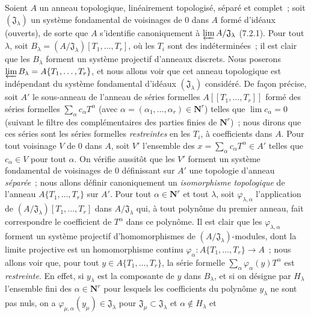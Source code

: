 \begin{env}[7.5.1]
\label{0.7.5.1-fr}
Soient $A$ un anneau topologique, linéairement topologisé, séparé et complet~;
soit $(\mathfrak J_\lambda)$ un système fondamental de voisinages de $0$ dans
$A$ formé d'idéaux (ouverts), de sorte que $A$ s'identifie canoniquement à
$\varprojlim A/\mathfrak J_\lambda$ (7.2.1). Pour tout $\lambda$, soit
$B_\lambda=(A/\mathfrak J_\lambda)[T_1,\ldots,T_r]$, où les $T_i$ sont des
indéterminées~; il est clair que les $B_\lambda$ forment un système projectif
d'anneaux discrets. Nous poserons
$\varprojlim B_\lambda=A\{T_1,\ldots,T_r\}$, et nous allons voir que cet anneau
topologique est indépendant du système fondamental d'idéaux
$(\mathfrak J_\lambda)$ considéré. De façon précise, soit $A'$ le sous-anneau
de l'anneau de séries formelles $A[\![T_1,\ldots,T_r]\!]$ formé des séries
formelles $\sum_\alpha c_\alpha T^\alpha$ (avec
$\alpha=(\alpha_1,\ldots,\alpha_r)\in\mathbf{N}^r$) telles que
$\lim c_\alpha=0$ (suivant le filtre des complémentaires des parties
finies de $\mathbf{N}^r$)~; nous dirons que ces séries sont les séries
formelles \emph{restreintes} en les $T_i$, à coefficients dans $A$.
Pour tout voisinage $V$ de $0$ dans $A$, soit $V'$ l'ensemble des
$x=\sum_\alpha c_\alpha T^\alpha\in A'$ telles que $c_\alpha\in V$ pour tout
$\alpha$. On vérifie aussitôt que les $V'$ forment un système fondamental de
voisinages de $0$ définissant sur $A'$ une topologie d'anneau \emph{séparée}~;
nous allons définir canoniquement un \emph{isomorphisme topologique} de
l'anneau $A\{T_1,\ldots,T_r\}$ sur $A'$. Pour tout
$\alpha\in\mathbf{N}^r$ et tout $\lambda$, soit
$\varphi_{\lambda,\alpha}$ l'application de
$(A/\mathfrak J_\lambda)[T_1,\ldots,T_r]$ dans
$A/\mathfrak J_\lambda$ qui, à tout polynôme du premier anneau, fait
correspondre le coefficient de $T^\alpha$ dans ce polynôme. Il est clair que
les $\varphi_{\lambda,\alpha}$ forment un système projectif d'homomorphismes
de $(A/\mathfrak J_\lambda)$-modules, dont la limite projective est un
homomorphisme continu
$\varphi_\alpha:A\{T_1,\ldots,T_r\}\to A$~; nous allons voir que, pour tout
$y\in A\{T_1,\ldots,T_r\}$, la série formelle
$\sum_\alpha\varphi_\alpha(y)T^\alpha$ est \emph{restreinte}. En effet, si
$y_\lambda$ est la composante de $y$ dans $B_\lambda$, et si on désigne par
$H_\lambda$ l'ensemble fini des $\alpha\in\mathbf{N}^r$ pour lesquels les
coefficients du polynôme $y_\lambda$ ne sont pas nuls, on a
$\varphi_{\mu,\alpha}(y_\mu)\in\mathfrak J_\lambda$ pour
$\mathfrak J_\mu\subset\mathfrak J_\lambda$ et $\alpha\notin H_\lambda$ et

\end{env}
